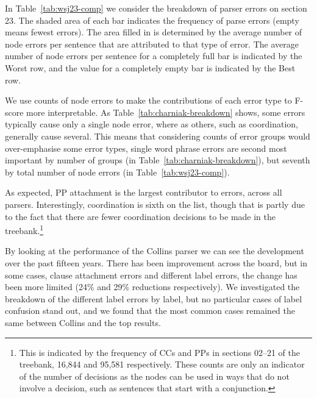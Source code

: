 \begin{landscape}





\end{landscape}

In Table~\ref{tab:wsj23-comp} we consider the breakdown of parser errors on \wsj section 23.
The shaded area of each bar indicates the frequency of parse errors (\myie empty means fewest errors).
The area filled in is determined by the average number of node errors per sentence that are attributed to that type of error.
The average number of node errors per sentence for a completely full bar is indicated by the Worst row, and the value for a completely empty bar is indicated by the Best row.

We use counts of node errors to make the contributions of each error type to F-score more interpretable.
As Table~\ref{tab:charniak-breakdown} shows, some errors typically cause only a single node error, where as others, such as coordination, generally cause several.
This means that considering counts of error groups would over-emphasise some error types, \myeg single word phrase errors are second most important by number of groups (in Table~\ref{tab:charniak-breakdown}), but seventh by total number of node errors (in Table~\ref{tab:wsj23-comp}).

As expected, PP attachment is the largest contributor to errors, across all parsers.
Interestingly, coordination is sixth on the list, though that is partly due to the fact that there are fewer coordination decisions to be made in the treebank.\footnote{This is indicated by the frequency of CCs and PPs in sections 02--21 of the treebank, 16,844 and 95,581 respectively.
These counts are only an indicator of the number of decisions as the nodes can be used in ways that do not involve a decision, such as sentences that start with a conjunction.}

By looking at the performance of the Collins parser we can see the development
over the past fifteen years.  There has been improvement across
the board, but in some cases, \myeg clause attachment errors and different label
errors, the change has been more limited (24\% and 29\% reductions respectively).  We
investigated the breakdown of the different label errors by label, but no
particular cases of label confusion stand out, and we found that the most
common cases remained the same between Collins and the top results.

